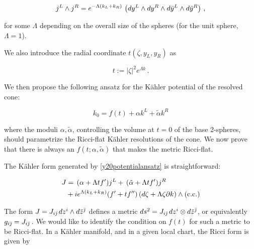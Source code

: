 \begin{equation}\label{spheresareEinstein}
	j^L \wedge j^R = e^{-\Lambda(k_L + k_R)}\, \left(dy^L \wedge dy^R \wedge d\bar y^L \wedge d\bar y^R\right)\,,
\end{equation}

for some $\Lambda$ depending on the overall size of the spheres (for the unit sphere, $\Lambda = 1$).

We also introduce the radial coordinate $t(\zeta,y_L,y_R)$ as 

\begin{equation}
	t := |\zeta|^2 e^{\Lambda k}\,.
\end{equation}

We then propose the following ansatz for the K\"ahler potential of the resolved cone:

\begin{equation}
	k_0 = f(t) + \alpha k^L + \tilde\alpha k^R \label{y20potentialansatz}
\end{equation}

where the moduli $\alpha,\tilde\alpha$, controlling the volume at $t=0$ of the base 2-spheres, should parametrize the Ricci-flat K\"ahler resolutions of the cone. We now prove that there is always an $f(t;\alpha,\tilde\alpha)$ that makes the metric Ricci-flat.

The K\"ahler form generated by \eqref{y20potentialansatz} is straightforward:

\begin{align}
	\begin{split}\label{y20kahlerformansatz}
	J &= \, (\alpha + \Lambda t f') j^L + \, (\tilde\alpha + \Lambda t f') j^R \\&+ i e^{\Lambda(k_L + k_R)} (f' + t f'') \, (d\zeta + \Lambda \zeta \partial k) \wedge (\mathrm{c.c.})
\end{split}
\end{align}

\newcommand{\fibral}{e^3 \wedge \bar e^{\bar 3}}




The form $J = J_{i\bar{\jmath}}\, dz^i \wedge d\bar z^{\bar\jmath}$ defines a metric $ds^2 = J_{i\bar{\jmath}}\, dz^i \otimes d\bar z^{\bar\jmath}$, or equivalently $g_{i\bar{\jmath}} = J_{i\bar{\jmath}}\,$. We would like to identify the condition on $f(t)$ for such a metric to be Ricci-flat. In a K\"ahler manifold, and in a given local chart, the Ricci form is given by


